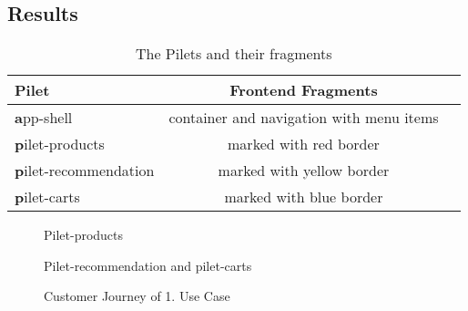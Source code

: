 \documentclass[a4paper]{book}
\begin{document}
\subsection{Results}

\begin{table}[h!]
    \captionsetup{justification=centering}
    \caption{The Pilets and their fragments}
    \label{tab:example_1}
    \centering
    \begin{tabular}{l | cc}
	\toprule
			\textbf{Pilet} & \textbf{Frontend Fragments}\\
	\midrule
	\textbf app-shell & container and navigation with menu items\\
	\textbf pilet-products              & marked with red border\\
	\textbf pilet-recommendation             & marked with yellow border\\
	\textbf pilet-carts              & marked with blue border\\
	\bottomrule
    \end{tabular}
\end{table}


\begin{figure}[h!]
    \centering
    \captionsetup{justification=centering}
    \hspace*{0.1\hsize}
    \caption{Pilet-products}
    \label{fig:Pilet-products}
\end{figure}

\begin{figure}[h!]
    \centering
    \captionsetup{justification=centering}
    \hspace*{0.1\hsize}
    \caption{Pilet-recommendation and pilet-carts}
    \label{fig:ui-product-details-repo}
\end{figure}

\begin{figure}[h!]
    \centering
    \captionsetup{justification=centering}
    \caption{Customer Journey of 1. Use Case}
    \label{Customer Journey of 1. Use Case}
\end{figure}
\end{document}
